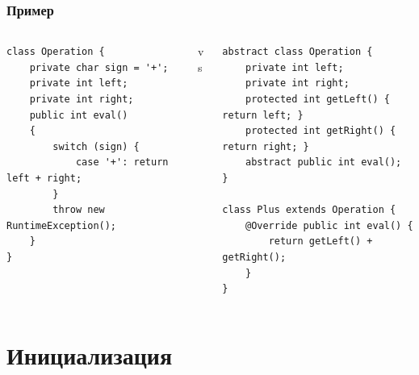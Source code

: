 \documentclass{../mcsslides}
\begin{document}
    \begin{frame}[fragile]
        \frametitle{Пример}
        \begin{footnotesize}
            \begin{columns}
                \begin{column}{0.35\textwidth}
                    \begin{verbatim}
class Operation {
    private char sign = '+';
    private int left;
    private int right;
    public int eval()
    {
        switch (sign) {
            case '+': return left + right;
        }
        throw new RuntimeException();
    }
}
                    \end{verbatim}
                \end{column}
                \begin{column}{0.1\textwidth}
                    vs
                \end{column}
                \begin{column}{0.55\textwidth}
                    \begin{verbatim}
abstract class Operation {
    private int left;
    private int right;
    protected int getLeft() { return left; }
    protected int getRight() { return right; }
    abstract public int eval();
}

class Plus extends Operation {
    @Override public int eval() { 
        return getLeft() + getRight(); 
    }
}
                    \end{verbatim}
                \end{column}
            \end{columns}
        \end{footnotesize}
    \end{frame}

    \section{Инициализация}
\end{document}
